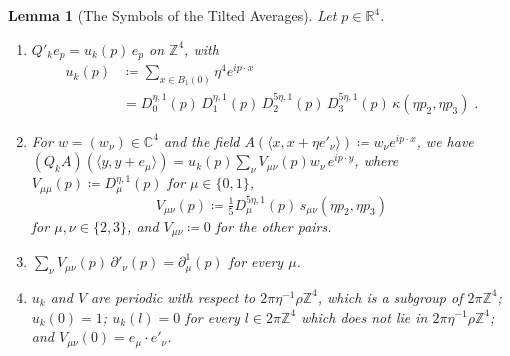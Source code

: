 \documentclass[11pt]{preprint}
\numberwithin{equation}{section}
\newtheorem{lemma}[theorem]{Lemma}
\theoremstyle{definition}
\theoremstyle{remark}
\theoremstyle{plain}
\begin{document}
\begin{lemma}[The Symbols of the Tilted Averages]\label{lem:symbols}
Let $p \in \mathbb R^4$.
\begin{enumerate}[label=(\roman*)]
\item $Q'_ke_p = u_k(p)\,e_p$ on $\mathbb Z^4$, with
\begin{equation}\label{eq:u-tilted}
\begin{split}
    u_k(p) &\coloneqq \sum_{x \in B_1(0)}\eta^4e^{ip \cdot x}\\
    &= D^{\eta,1}_0(p)\,D^{\eta,1}_1(p)\,D^{5\eta,1}_2(p)\,D^{5\eta,1}_3(p)\,\kappa(\eta p_2, \eta p_3)\;.
\end{split}
\end{equation}
\item For $w = (w_\nu) \in \mathbb C^4$ and the field $A(\langle x, x + \eta e'_\nu\rangle) \coloneqq w_\nu e^{ip \cdot x}$, we have $(Q_kA)(\langle y, y + e_\mu\rangle) = u_k(p)\sum_\nu V_{\mu\nu}(p)w_\nu\,e^{ip \cdot y}$, where $V_{\mu\mu}(p) \coloneqq D^{\eta,1}_\mu(p)$ for $\mu \in \{ 0, 1 \}$,
\begin{equation}\label{eq:v-tilted}
    V_{\mu\nu}(p) \coloneqq \tfrac15D^{5\eta,1}_\mu(p)\,s_{\mu\nu}(\eta p_2, \eta p_3)
\end{equation}
for $\mu, \nu \in \{ 2, 3 \}$, and $V_{\mu\nu} \coloneqq 0$ for the other pairs.
\item $\sum_\nu V_{\mu\nu}(p)\,\partial'_\nu(p) = \partial^1_\mu(p)$ for every $\mu$.
\item $u_k$ and $V$ are periodic with respect to $2\pi\eta^{-1}\rho\mathbb Z^4$, which is a subgroup of $2\pi\mathbb Z^4$; $u_k(0) = 1$; $u_k(l) = 0$ for every $l \in 2\pi\mathbb Z^4$ which does not lie in $2\pi\eta^{-1}\rho\mathbb Z^4$; and $V_{\mu\nu}(0) = e_\mu \cdot e'_\nu$.
\end{enumerate}
\end{lemma}
\end{document}
